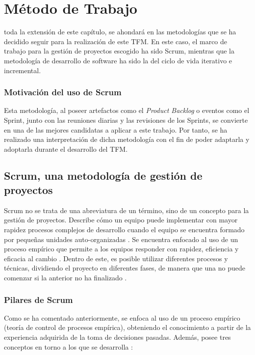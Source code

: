 \chapter{Método de Trabajo}
\label{chap:metodo}

 toda la extensión de este capítulo, se ahondará en las metodologías que se ha decidido seguir para la realización de este \acs{TFM}. En este caso, el marco de trabajo para la gestión de proyectos escogido ha sido Scrum, mientras que la metodología de desarrollo de software ha sido la del ciclo de vida iterativo e incremental.

\subsection{Motivación del uso de Scrum}
Esta metodología, al poseer artefactos como el \textit{Product Backlog} o eventos como el Sprint, junto con las reuniones diarias y las revisiones de los Sprints, se convierte en una de las mejores candidatas a aplicar a este trabajo. Por tanto, se ha realizado una interpretación de dicha metodología con el fin de poder adaptarla y adoptarla durante el desarrollo del \acs{TFM}.

\section{Scrum, una metodología de gestión de proyectos}
Scrum no se trata de una abreviatura de un término, sino de un concepto para la gestión de proyectos. Describe cómo un equipo puede implementar con mayor rapidez procesos complejos de desarrollo cuando el equipo se encuentra formado por pequeñas unidades auto-organizadas \cite{robertmulsow2018}. Se encuentra enfocado al uso de un proceso empírico que permite a los equipos responder con rapidez, eficiencia y eficacia al cambio \cite{michelesliger}. Dentro de este, es posible utilizar diferentes procesos y técnicas, dividiendo el proyecto en diferentes fases, de manera que una no puede comenzar si la anterior no ha finalizado \cite{scrumguide}.

\subsection{Pilares de Scrum}
Como se ha comentado anteriormente, se enfoca al uso de un proceso empírico (teoría de control de procesos empírica), obteniendo el conocimiento a partir de la experiencia adquirida de la toma de decisiones pasadas. Además, posee tres conceptos en torno a los que se desarrolla \cite{scrumguide}:

